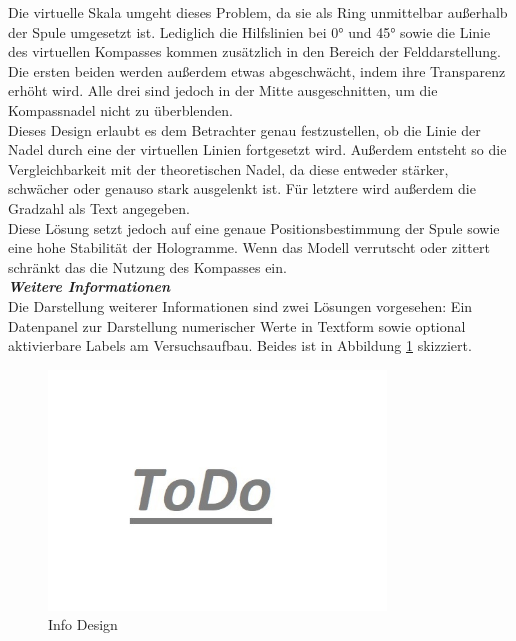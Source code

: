Die virtuelle Skala umgeht dieses Problem, da sie als Ring unmittelbar außerhalb der Spule umgesetzt ist. Lediglich die Hilfslinien bei 0° und 45° sowie die Linie des virtuellen Kompasses kommen zusätzlich in den Bereich der Felddarstellung. Die ersten beiden werden außerdem etwas abgeschwächt, indem ihre Transparenz erhöht wird. Alle drei sind jedoch in der Mitte ausgeschnitten, um die Kompassnadel nicht zu überblenden.\\

Dieses Design erlaubt es dem Betrachter genau festzustellen, ob die Linie der Nadel durch eine der virtuellen Linien fortgesetzt wird. Außerdem entsteht so die Vergleichbarkeit mit der theoretischen Nadel, da diese entweder stärker, schwächer oder genauso stark ausgelenkt ist. Für letztere wird außerdem die Gradzahl als Text angegeben.\\

Diese Lösung setzt jedoch auf eine genaue Positionsbestimmung der Spule sowie eine hohe Stabilität der Hologramme. Wenn das Modell verrutscht oder zittert schränkt das die Nutzung des Kompasses ein.\\

\textbf{\textit{Weitere Informationen}}\\
Die Darstellung weiterer Informationen sind zwei Lösungen vorgesehen: Ein Datenpanel zur Darstellung numerischer Werte in Textform sowie optional aktivierbare Labels am Versuchsaufbau. Beides ist in Abbildung \ref{img:info-design} skizziert.


\begin{figure}[h!]
	\centering
	\includegraphics[width=0.8\textwidth]{images/todo.jpg}
	\caption{Info Design}
	\label{img:info-design}
\end{figure}

